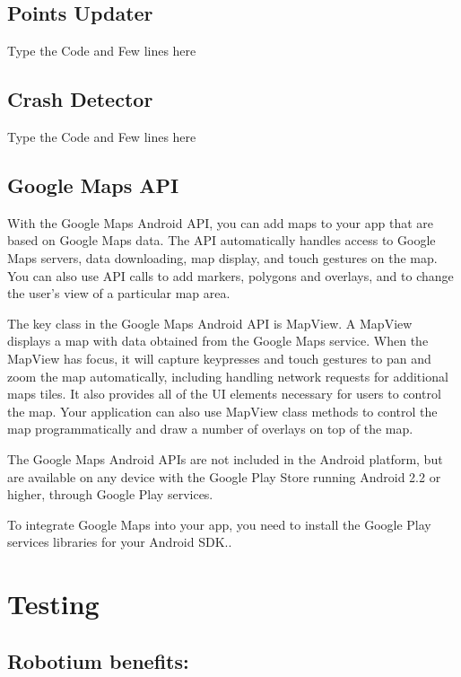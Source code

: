 

\subsection{Points Updater}

Type the Code and Few lines here

\subsection{Crash Detector}

Type the Code and Few lines here

\subsection{Google Maps API}
With the Google Maps Android API, you can add maps to your app that are based on Google Maps data. The API automatically handles access to Google Maps servers, data downloading, map display, and touch gestures on the map. You can also use API calls to add markers, polygons and overlays, and to change the user's view of a particular map area.

The key class in the Google Maps Android API is MapView. A MapView displays a map with data obtained from the Google Maps service. When the MapView has focus, it will capture keypresses and touch gestures to pan and zoom the map automatically, including handling network requests for additional maps tiles. It also provides all of the UI elements necessary for users to control the map. Your application can also use MapView class methods to control the map programmatically and draw a number of overlays on top of the map.

The Google Maps Android APIs are not included in the Android platform, but are available on any device with the Google Play Store running Android 2.2 or higher, through Google Play services.

To integrate Google Maps into your app, you need to install the Google Play services libraries for your Android SDK..




\section{Testing}

\subsection{Robotium  benefits:}

